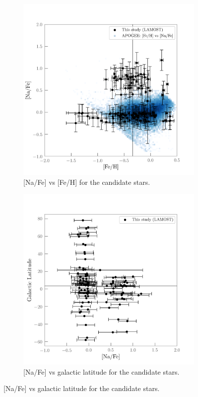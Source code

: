 \documentclass[a4paper,fleqn,usenatbib]{mnras}
\begin{document}
\begin{figure}
\centering
\begin{subfigure}{0.35\textwidth}
\centering
	\includegraphics[width=\columnwidth]{NavsFeh.png}
    \caption{[Na/Fe] vs [Fe/H] for the candidate stars.}
    \label{NavsFeh}
\end{subfigure}

\begin{subfigure}{0.35\textwidth}
\centering
	\includegraphics[width=\columnwidth]{Navsb.png}
    \caption{[Na/Fe] vs galactic latitude for the candidate stars.}
    \label{Navsb}
\end{subfigure}



\end{figure}
\end{document}
